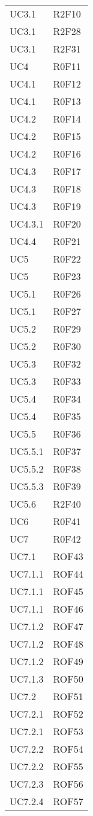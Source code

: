 \documentclass[../AnalisiDeiRequisiti.tex]{subfiles}
\begin{document}
\begin{longtable}{p{4cm}!{\VRule[1pt]}p{4cm}}
UC3.1 & R2F10 \\
UC3.1 & R2F28 \\
UC3.1 & R2F31 \\
UC4 & R0F11 \\
UC4.1 & R0F12 \\
UC4.1 & R0F13 \\
UC4.2 & R0F14 \\
UC4.2 & R0F15 \\
UC4.2 & R0F16 \\
UC4.3 & R0F17 \\
UC4.3 & R0F18 \\
UC4.3 & R0F19 \\
UC4.3.1 & R0F20 \\
UC4.4 & R0F21 \\
UC5 & R0F22 \\
UC5 & R0F23 \\
UC5.1 & R0F26 \\
UC5.1 & R0F27 \\
UC5.2 & R0F29 \\
UC5.2 & R0F30 \\
UC5.3 & R0F32 \\
UC5.3 & R0F33 \\
UC5.4 & R0F34 \\
UC5.4 & R0F35 \\
UC5.5 & R0F36 \\
UC5.5.1 & R0F37 \\
UC5.5.2 & R0F38 \\
UC5.5.3 & R0F39 \\
UC5.6 & R2F40 \\
UC6 & R0F41 \\
UC7 & R0F42 \\
UC7.1 & ROF43 \\
UC7.1.1 & ROF44 \\
UC7.1.1 & ROF45 \\
UC7.1.1 & ROF46 \\
UC7.1.2 & ROF47 \\
UC7.1.2 & ROF48 \\
UC7.1.2 & ROF49 \\
UC7.1.3 & ROF50 \\
UC7.2 & ROF51 \\
UC7.2.1 & ROF52 \\
UC7.2.1 & ROF53 \\
UC7.2.2 & ROF54 \\
UC7.2.2 & ROF55 \\
UC7.2.3 & ROF56 \\
UC7.2.4 & ROF57 \\

\end{longtable}
\end{document}
